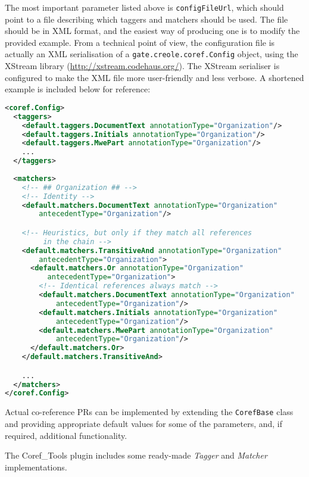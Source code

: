 The most important parameter listed above is {\tt configFileUrl}, which should
point to a file describing which taggers and matchers should be used. The file
should be in XML format, and the easiest way of producing one is to modify the
provided example. From a technical point of view, the configuration file is
actually an XML serialisation of a \lstinline!gate.creole.coref.Config! object,
using the XStream library (\url{http://xstream.codehaus.org/}). The XStream
serialiser is configured to make the XML file more user-friendly and less
verbose. A shortened example is included below for reference:
\begin{lstlisting}[language=XML]
<coref.Config>
  <taggers>
    <default.taggers.DocumentText annotationType="Organization"/>
    <default.taggers.Initials annotationType="Organization"/>
    <default.taggers.MwePart annotationType="Organization"/>
    ...
  </taggers>
  
  <matchers>
    <!-- ## Organization ## -->
    <!-- Identity -->
    <default.matchers.DocumentText annotationType="Organization" 
        antecedentType="Organization"/>

    <!-- Heuristics, but only if they match all references 
         in the chain -->  
    <default.matchers.TransitiveAnd annotationType="Organization" 
        antecedentType="Organization">
      <default.matchers.Or annotationType="Organization" 
          antecedentType="Organization">
        <!-- Identical references always match -->
        <default.matchers.DocumentText annotationType="Organization" 
            antecedentType="Organization"/>
        <default.matchers.Initials annotationType="Organization" 
            antecedentType="Organization"/>
        <default.matchers.MwePart annotationType="Organization" 
            antecedentType="Organization"/>
      </default.matchers.Or>
    </default.matchers.TransitiveAnd>

    ...
  </matchers>
</coref.Config>
\end{lstlisting}

Actual co-reference PRs can be implemented by extending the
\lstinline!CorefBase! class and providing appropriate default values for some of
the parameters, and, if required, additional functionality.

The Coref\_Tools plugin includes some ready-made {\em Tagger} and {\em Matcher}
implementations.

